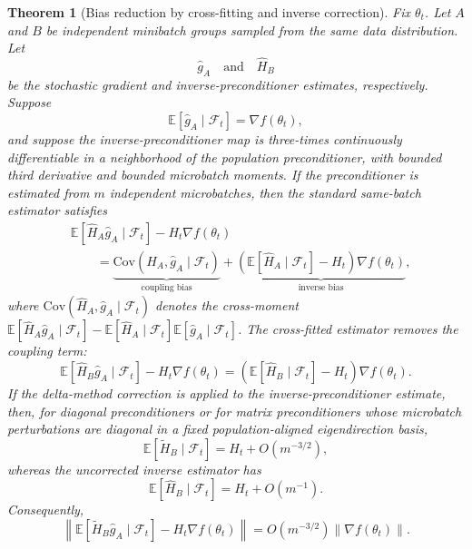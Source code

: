 \documentclass{article}
\newcommand{\E}{\mathbb{E}}
\newtheorem{theorem}{Theorem}
\begin{document}
\begin{theorem}[Bias reduction by cross-fitting and inverse correction]
\label{thm:bias-reduction}
Fix $\theta_t$. Let $A$ and $B$ be independent minibatch groups sampled from the same data distribution. Let
\begin{equation}
    \hat g_A
    \quad\text{and}\quad
    \widehat H_B
\end{equation}
be the stochastic gradient and inverse-preconditioner estimates, respectively. Suppose
\begin{equation}
    \E[\hat g_A\mid\mathcal F_t]=\nabla f(\theta_t),
\end{equation}
and suppose the inverse-preconditioner map is three-times continuously differentiable in a neighborhood of the population preconditioner, with bounded third derivative and bounded microbatch moments. If the preconditioner is estimated from $m$ independent microbatches, then the standard same-batch estimator satisfies
\begin{align}
    &\E[\widehat H_A\hat g_A\mid\mathcal F_t]
    -
    H_t\nabla f(\theta_t) \nonumber \\
    &\qquad =
    \underbrace{
    \mathrm{Cov}(\widehat H_A,\hat g_A\mid\mathcal F_t)
    }_{\text{coupling bias}}
    +
    \underbrace{
    \left(\E[\widehat H_A\mid\mathcal F_t]-H_t\right)
    \nabla f(\theta_t)
    }_{\text{inverse bias}},
\end{align}
where $\mathrm{Cov}(\widehat H_A,\hat g_A\mid\mathcal F_t)$ denotes the cross-moment
$\E[\widehat H_A\hat g_A\mid\mathcal F_t]
-\E[\widehat H_A\mid\mathcal F_t]\E[\hat g_A\mid\mathcal F_t]$.
The cross-fitted estimator removes the coupling term:
\begin{equation}
    \E[\widehat H_B\hat g_A\mid\mathcal F_t]
    -
    H_t\nabla f(\theta_t)
    =
    \left(\E[\widehat H_B\mid\mathcal F_t]-H_t\right)
    \nabla f(\theta_t).
\end{equation}
If the delta-method correction is applied to the inverse-preconditioner estimate, then, for diagonal preconditioners or for matrix preconditioners whose microbatch perturbations are diagonal in a fixed population-aligned eigendirection basis,
\begin{equation}
    \E[\widetilde H_B\mid\mathcal F_t]
    =
    H_t + O(m^{-3/2}),
\end{equation}
whereas the uncorrected inverse estimator has
\begin{equation}
    \E[\widehat H_B\mid\mathcal F_t]
    =
    H_t + O(m^{-1}).
\end{equation}
Consequently,
\begin{equation}
    \left\|
    \E[\widetilde H_B\hat g_A\mid\mathcal F_t]
    -
    H_t\nabla f(\theta_t)
    \right\|
    =
    O(m^{-3/2})\|\nabla f(\theta_t)\|.
\end{equation}
\end{theorem}
\end{document}
